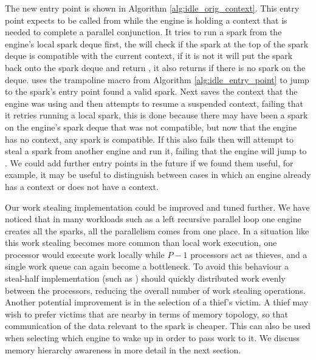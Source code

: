 The new entry point \idleorigcontext is shown in Algorithm
\ref{alg:idle_orig_context}.
This entry point expects to be called from \joinandcontinue while the engine
is holding a context that is needed to complete a parallel conjunction.
It tries to run a spark from the engine's local spark deque first,
the \tryrunlocalspark will check if the spark at the top of the spark deque
is compatible with the current context,
if it is not it will put the spark back onto the spark deque and return
\NULL, it also returns \NULL if there is no spark on the deque.
\idleorigcontext uses the trampoline macro from Algorithm
\ref{alg:idle_entry_point} to jump to the spark's entry point
\tryrunlocalspark found a valid spark.
Next \idleorigcontext saves the context that the engine was using and then
attempts to resume a suspended context,
failing that it retries running a local spark,
this is done because there may have been a spark on the engine's spark deque
that was not compatible, but now that the engine has no context, any spark
is compatible.
If this also fails then
\idleorigcontext will attempt to steal a spark from another engine and run
it,
failing that the engine will jump to \sleep.
We could add further entry points in the future if we found them useful,
for example,
it may be useful to distinguish between cases in which an engine already has a
context or does not have a context.





Our work stealing implementation could be improved and tuned further.
We have noticed that in many workloads such as a left recursive parallel
loop one engine creates all the sparks, all the parallelism comes from one
place.
In a situation like this work stealing becomes more common than local work
execution,
one processor would execute work locally while $P - 1$ processors act as
thieves, and a single work queue can again become a bottleneck.
To avoid this behaviour
a steal-half implementation (such as \citet{hendler:2002:stealhalf})
should quickly distributed work evenly between the processors,
reducing the overall number of work stealing operations.
Another potential improvement is in the selection of a thief's victim.
A thief may wish to prefer victims that are nearby in terms of memory
topology, so that communication of the data relevant to the spark is
cheaper.
This can also be used when selecting which engine to wake up in order to
pass work to it.
We discuss memory hierarchy awareness in more detail in the next section.

